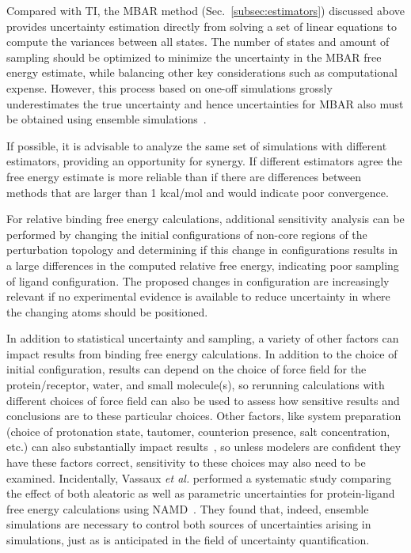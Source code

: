 \documentclass[9pt,bestpractices]{livecoms}
\begin{document}
Compared with TI, the MBAR method (Sec.~\ref{subsec:estimators}) discussed above provides uncertainty estimation directly from solving a set of linear equations to compute the variances between all states. 
The number of states and amount of sampling should be optimized to minimize the uncertainty in the MBAR free energy estimate, while balancing other key considerations such as computational expense. 
However, this process based on one-off simulations grossly underestimates the true uncertainty and hence uncertainties for MBAR also must be obtained using ensemble simulations~\cite{bhati2018, wade2022}.

If possible, it is advisable to analyze the same set of simulations with different estimators, providing an opportunity for synergy. If different estimators agree the free energy estimate is more reliable than if there are differences between methods that are larger than 1 kcal/mol and would indicate poor convergence. 

For relative binding free energy calculations, additional sensitivity analysis can be performed by changing the initial configurations of non-core regions of the perturbation topology and determining if this change in configurations results in a large differences in the computed relative free energy, indicating poor sampling of ligand configuration.
The proposed changes in configuration are increasingly relevant if no experimental evidence is available to reduce uncertainty in where the changing atoms should be positioned.

In addition to statistical uncertainty and sampling, a variety of other factors can impact results from binding free energy calculations. In addition to the choice of initial configuration, results can depend on the choice of force field for the protein/receptor, water, and small molecule(s), so rerunning calculations with different choices of force field can also be used to assess how sensitive results and conclusions are to these particular choices. Other factors, like system preparation (choice of protonation state, tautomer, counterion presence, salt concentration, etc.) can also substantially impact results~\cite{mobley2017predicting, mobley2017predictinga}, so unless modelers are confident they have these factors correct, sensitivity to these choices may also need to be examined.
Incidentally, Vassaux \textit{et al.} performed a systematic study comparing the effect of both aleatoric as well as parametric uncertainties for protein-ligand free energy calculations using NAMD~\cite{vassaux2021}. They found that, indeed, ensemble simulations are necessary to control both sources of uncertainties arising in simulations, just as is anticipated in the field of uncertainty quantification.
\end{document}

